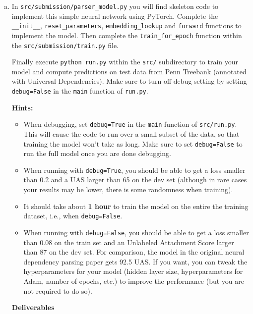 \begin{enumerate}[(a)]
    \item {} In \texttt{src/submission/parser\_model.py} you will find skeleton code to implement this simple neural network using PyTorch. Complete the \texttt{\_\_init\_\_}, \texttt{reset\_parameters}, \texttt{embedding\_lookup} and \texttt{forward} functions to implement the model. 
    Then complete the \texttt{train\_for\_epoch} function within the \texttt{src/submission/train.py} file. \newline
   
    Finally execute \texttt{python run.py} within the \texttt{src/} subdirectory to train your model and compute predictions
    on test data from Penn Treebank (annotated with Universal Dependencies). Make sure to turn off debug setting by setting \texttt{debug=False} in the \texttt{main} function of \texttt{run.py}.
    
    \textbf{Hints:}
    \begin{itemize}
        \item
            When debugging, set \texttt{debug=True} in the \texttt{main} function of \texttt{src/run.py}. This will cause the code to run over a small subset of the data, so that training the model won't take as long. Make sure to set \texttt{debug=False} to run the full model once you are done debugging.

        \item
            When running with \texttt{debug=True}, you should be able to get a loss smaller than 0.2 and a UAS larger than 65 on the dev set (although in rare cases your results may be lower, there is some randomness when training).
            
        \item It should take about \textbf{1 hour} to train the model on the entire the training dataset, i.e., when \texttt{debug=False}.
        
        \item When running with \texttt{debug=False}, you should be able to get a loss smaller than 0.08 on the train set and an Unlabeled Attachment Score larger than 87 on the dev set. For comparison, the model in the original neural dependency parsing paper gets 92.5 UAS. If you want, you can tweak the hyperparameters for your model (hidden layer size, hyperparameters for Adam, number of epochs, etc.) to improve the performance (but you are not required to do so).
    \end{itemize}
    \clearpage

    \textbf{Deliverables}


\end{enumerate}
